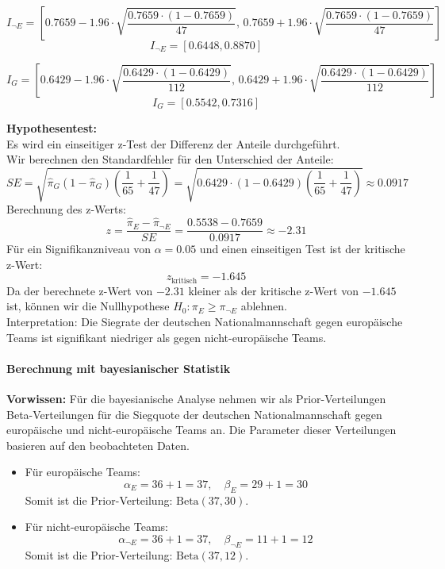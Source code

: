 \documentclass[a4paper,12pt]{article}
\begin{document}
\[
I_{\neg E} = \left[ 0.7659 - 1.96 \cdot \sqrt{\frac{0.7659 \cdot (1-0.7659)}{47}}, \, 0.7659 + 1.96 \cdot \sqrt{\frac{0.7659 \cdot (1-0.7659)}{47}} \right]
\]
\[
I_{\neg E} = [0.6448, 0.8870]
\]

\[
I_G = \left[ 0.6429 - 1.96 \cdot \sqrt{\frac{0.6429 \cdot (1-0.6429)}{112}}, \, 0.6429 + 1.96 \cdot \sqrt{\frac{0.6429 \cdot (1-0.6429)}{112}} \right]
\]
\[
I_G = [0.5542, 0.7316]
\]

\textbf{Hypothesentest:} \\
Es wird ein einseitiger z-Test der Differenz der Anteile durchgeführt. \\

Wir berechnen den Standardfehler für den Unterschied der Anteile:
\[
SE = \sqrt{\hat{\pi}_G(1 - \hat{\pi}_G) \left(\frac{1}{65} + \frac{1}{47}\right)} = \sqrt{0.6429 \cdot (1 - 0.6429) \left(\frac{1}{65} + \frac{1}{47}\right)} \approx 0.0917
\]
Berechnung des z-Werts:
\[
z = \frac{\hat{\pi}_E - \hat{\pi}_{\neg E}}{SE} = \frac{0.5538 - 0.7659}{0.0917} \approx -2.31
\]
Für ein Signifikanzniveau von \( \alpha = 0.05 \) und einen einseitigen Test ist der kritische z-Wert:
\[
z_{\text{kritisch}} = -1.645
\]
Da der berechnete z-Wert von \(-2.31\) kleiner als der kritische z-Wert von \(-1.645\) ist, können wir die Nullhypothese \( H_0 : \pi_E \geq \pi_{\neg E} \) ablehnen.\\
Interpretation: Die Siegrate der deutschen Nationalmannschaft gegen europäische Teams ist signifikant niedriger als gegen nicht-europäische Teams.

\paragraph{Berechnung mit bayesianischer Statistik}\leavevmode\newline

\textbf{Vorwissen:}
Für die bayesianische Analyse nehmen wir als Prior-Verteilungen Beta-Verteilungen für die Siegquote der deutschen Nationalmannschaft gegen europäische und nicht-europäische Teams an. Die Parameter dieser Verteilungen basieren auf den beobachteten Daten.

\begin{itemize}
  \item Für europäische Teams:
    \[
    \alpha_E = 36 + 1 = 37, \quad \beta_E = 29 + 1 = 30
    \]
    Somit ist die Prior-Verteilung: \( \text{Beta}(37, 30) \).

  \item Für nicht-europäische Teams:
    \[
    \alpha_{\neg E} = 36 + 1 = 37, \quad \beta_{\neg E} = 11 + 1 = 12
    \]
    Somit ist die Prior-Verteilung: \( \text{Beta}(37, 12) \).
\end{itemize}
\end{document}
